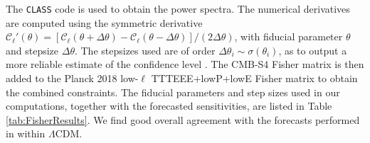 The \texttt{CLASS} code \cite{Blas:2011rf} is used to obtain the power spectra. The numerical derivatives are computed using the symmetric derivative $\mathcal{C}_\ell'(\theta) = \left[\mathcal{C}_\ell(\theta+\Delta\theta)-\mathcal{C}_\ell(\theta-\Delta\theta)\right]/(2\Delta\theta)$, with fiducial parameter $\theta$ and stepsize $\Delta\theta$. The stepsizes used are of order $\Delta\theta_i \sim \sigma(\theta_i)$, as to output a more reliable estimate of the confidence level \cite{Perotto:2006rj}. The CMB-S4 Fisher matrix is then added to the Planck 2018 low-$\ell$ TTTEEE+lowP+lowE Fisher matrix to obtain the combined constraints. The fiducial parameters and step sizes used in our computations, together with the forecasted sensitivities, are listed in Table \ref{tab:FisherResults}. We find good overall agreement with the forecasts performed in \cite{Abazajian:2016yjj} within $\Lambda$CDM. 

